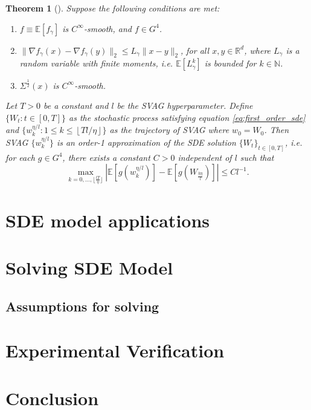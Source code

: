 \documentclass[12pt]{article}
\newtheorem{theorem}{Theorem}[section]
\theoremstyle{definition}
\numberwithin{equation}{section}
\newcommand{\N}{\mathbb{N}}
\newcommand{\R}{\mathbb{R}}
\newcommand{\ev}[1]{\mathbb{E}\left[{#1}\right]}
\newcommand{\norm}[1]{\lVert{#1}\rVert_2}
\begin{document}
\begin{theorem}[\cite{liValidityModelingSGD2021}]
  Suppose the following conditions are met:
  \begin{enumerate}[label=(\roman*)]
    \item $f \equiv \ev{f_{\gamma}}$ is $C^{\infty}$-smooth, and $f \in G^4$.
    \item $\norm{\nabla f_{\gamma}(x) - \nabla f_{\gamma}(y)} \leq L_{\gamma} \norm{x - y}$, for all $x, y \in \R^d$, where $L_{\gamma}$ is a random variable with finite moments, i.e. $\ev{L_{\gamma}^k}$ is bounded for $k \in \N$.
    \item $\Sigma^{\frac{1}{2}}(x)$ is $C^{\infty}$-smooth.
  \end{enumerate}
  Let $T > 0$ be a constant and $l$ be the SVAG hyperparameter. Define $\{W_t : t \in [0,T] \}$ as the stochastic process satisfying equation \eqref{eq:first_order_sde} and $\{w_k^{\eta/l}: 1 \leq k \leq \left\lfloor Tl/\eta \right\rfloor \}$ as the trajectory of SVAG where $w_0 = W_0$. Then SVAG $\{w_k^{\eta/l}\}$ is an order-1 approximation of the SDE solution $\{W_t\}_{t \in [0,T]}$, i.e. for each $g \in G^4$, there exists a constant $C > 0$ independent of $l$ such that
  \begin{equation*}
    \max_{k=0,\dots, \lfloor \frac{lT}{\eta} \rfloor} \left\lvert \ev{g(w^{\eta/l}_k)} - \ev{g(W_{\frac{k\eta}{l}})} \right\rvert \leq C l^{-1}.
  \end{equation*}
\end{theorem}
\section{SDE model applications}
\label{sec:sdeModelApplicatios}
\section{Solving SDE Model}
\label{sec:SolvingSDEModel}
\subsection{Assumptions for solving}
\section{Experimental Verification} 
\label{sec:ExperimentalVerification}

\section{Conclusion}
\end{document}
